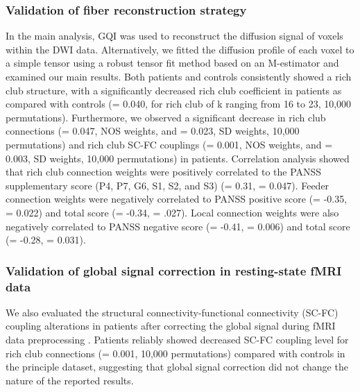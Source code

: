 \begin{refsection}
\subsubsection*{Validation of fiber reconstruction strategy}
In the main analysis, GQI \citep{YEH2010} was used to reconstruct the diffusion signal of voxels within the DWI data. Alternatively, we fitted the diffusion profile of each voxel to a simple tensor using a robust tensor fit method based on an M-estimator \citep{Chang2005RESTORERE} and examined our main results. Both patients and controls consistently showed a rich club structure, with a significantly decreased rich club coefficient in patients as compared with controls (\pval = 0.040, for rich club of k ranging from 16 to 23, 10,000 permutations). Furthermore, we observed a significant decrease in rich club connections (\pval = 0.047, NOS weights, and \pval = 0.023, SD weights, 10,000 permutations) and rich club SC-FC couplings (\pval = 0.001, NOS weights, and \pval = 0.003, SD weights, 10,000 permutations) in patients. Correlation analysis showed that rich club connection weights were positively correlated to the PANSS supplementary score (P4, P7, G6, S1, S2, and S3) (\rval = 0.31, \pval = 0.047). Feeder connection weights were negatively correlated to PANSS positive score (\rval = -0.35, \pval = 0.022) and total score (\pval = -0.34, \pval = .027). Local connection weights were also negatively correlated to PANSS negative score (\rval = -0.41, \pval = 0.006) and total score (\pval = -0.28, \pval = 0.031).

\subsubsection*{Validation of global signal correction in resting-state fMRI data}
We also evaluated the structural connectivity-functional connectivity (SC-FC) coupling alterations in patients after correcting the global signal during fMRI data preprocessing \citep{Murphy2017TowardsAC}. Patients reliably showed decreased SC-FC coupling level for rich club connections (\pval = 0.001, 10,000 permutations) compared with controls in the principle dataset, suggesting that global signal correction did not change the nature of the reported results.


\end{refsection}

